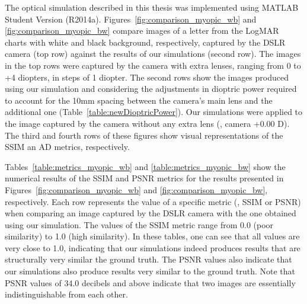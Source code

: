 %
The optical simulation described in this thesis was implemented using MATLAB Student Version (R2014a).
%
Figures~\ref{fig:comparison_myopic_wb} and \ref{fig:comparison_myopic_bw} compare images of a letter from the LogMAR charts with 
white and black background, respectively, captured by the DSLR camera (top row) against the results of our simulations (second row). 
The images in the top rows were captured by the camera with extra lenses, ranging from 0 to +4 diopters, in steps of 1 diopter. The second rows show the images produced using our simulation and considering the adjustments in dioptric power required to account for the 10mm spacing between the camera's main lens and the additional one (Table~\ref{table:newDioptricPower}). Our simulations were applied to the image captured by the camera without any extra lens (\ie, camera +0.00 D). The third and fourth rows of these figures show visual representations of the SSIM an AD metrics, respectively. 


Tables~\ref{table:metrics_myopic_wb} and \ref{table:metrics_myopic_bw} show the numerical results of the SSIM and PSNR metrics for the results presented in Figures~\ref{fig:comparison_myopic_wb} and \ref{fig:comparison_myopic_bw}, respectively. Each row represents the value of a specific metric (\ie, SSIM or PSNR) when comparing an image captured by the DSLR camera with the one obtained using our simulation.  
The values of the SSIM metric range from 0.0 (poor similarity) to 1.0 (high similarity). In these tables, one can see that all values are very close to 1.0, indicating that our simulations indeed produces results that are structurally very  similar the ground truth. The PSNR values also indicate that our simulations also produce results very similar to the ground truth. Note that PSNR values of 34.0 decibels and above indicate that two images are essentially indistinguishable from each other.  

